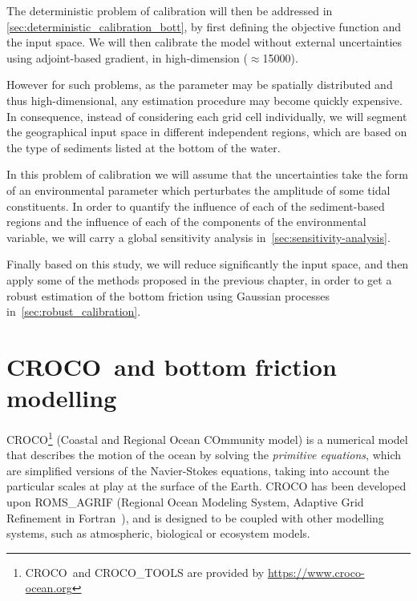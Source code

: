 \documentclass[../../Main_ManuscritThese.tex]{subfiles}
\newcommand{\CROCO}{CROCO}
\begin{document}
The deterministic problem of calibration will then be addressed in
\cref{sec:deterministic_calibration_bott}, by first defining the
objective function and the input space. We will then calibrate the
model without external uncertainties using adjoint-based gradient, in
high-dimension ($\approx$\num{15000}).

However for such problems, as the parameter may be spatially
distributed and thus high-dimensional, any estimation procedure may
become quickly expensive.  In consequence, instead of considering each
grid cell individually, we will segment the geographical input space
in different independent regions, which are based on the type of
sediments listed at the bottom of the water.

In this problem of calibration we will assume that the uncertainties
take the form of an environmental parameter which perturbates the
amplitude of some tidal constituents.  In order to quantify the
influence of each of the sediment-based regions and the influence of
each of the components of the environmental variable, we will carry a
global sensitivity analysis in~\cref{sec:sensitivity-analysis}.

Finally based on this study, we will reduce significantly the input
space, and then apply some of the methods proposed in the previous
chapter, in order to get a robust estimation of the bottom friction
using Gaussian processes in~\cref{sec:robust_calibration}.


\section{\CROCO\ and bottom friction modelling}
\label{sec:croco_bottom_fr}
\CROCO{}\footnote{\CROCO\ and CROCO\_TOOLS are provided by
  \url{https://www.croco-ocean.org}} (Coastal and Regional Ocean
COmmunity model) is a numerical model that describes the motion of the
ocean by solving the \emph{primitive equations}, which are simplified
versions of the Navier-Stokes equations, taking into account the
particular scales at play at the surface of the Earth. \CROCO{} has
been developed upon
ROMS\_AGRIF %
(Regional Ocean Modeling System, Adaptive Grid Refinement in
Fortran~\cite{debreu_two-way_2012}), and is designed to be coupled
with other modelling systems, such as atmospheric, biological or
ecosystem models.

\end{document}

